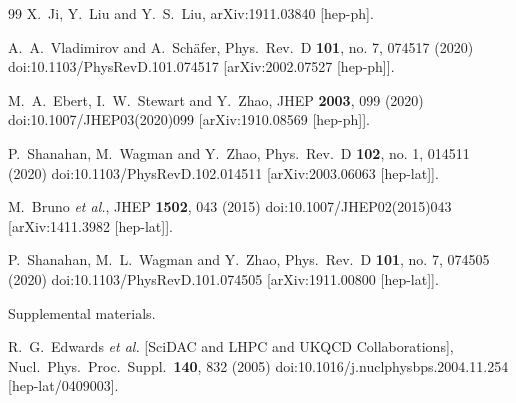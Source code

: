 \begin{thebibliography}{99}
  X.~Ji, Y.~Liu and Y.~S.~Liu,
  arXiv:1911.03840 [hep-ph].


  A.~A.~Vladimirov and A.~Schäfer,
  Phys.\ Rev.\ D {\bf 101}, no. 7, 074517 (2020)
  doi:10.1103/PhysRevD.101.074517
  [arXiv:2002.07527 [hep-ph]].


  M.~A.~Ebert, I.~W.~Stewart and Y.~Zhao,
  JHEP {\bf 2003}, 099 (2020)
  doi:10.1007/JHEP03(2020)099
  [arXiv:1910.08569 [hep-ph]].


  P.~Shanahan, M.~Wagman and Y.~Zhao,
  Phys.\ Rev.\ D {\bf 102}, no. 1, 014511 (2020)
  doi:10.1103/PhysRevD.102.014511
  [arXiv:2003.06063 [hep-lat]].


  M.~Bruno {\it et al.},
  JHEP {\bf 1502}, 043 (2015)
  doi:10.1007/JHEP02(2015)043
  [arXiv:1411.3982 [hep-lat]].


  P.~Shanahan, M.~L.~Wagman and Y.~Zhao,
  Phys.\ Rev.\ D {\bf 101}, no. 7, 074505 (2020)
  doi:10.1103/PhysRevD.101.074505
  [arXiv:1911.00800 [hep-lat]].


Supplemental materials.

  R.~G.~Edwards {\it et al.} [SciDAC and LHPC and UKQCD Collaborations],
  Nucl.\ Phys.\ Proc.\ Suppl.\  {\bf 140}, 832 (2005)
  doi:10.1016/j.nuclphysbps.2004.11.254
  [hep-lat/0409003].

\end{thebibliography}
